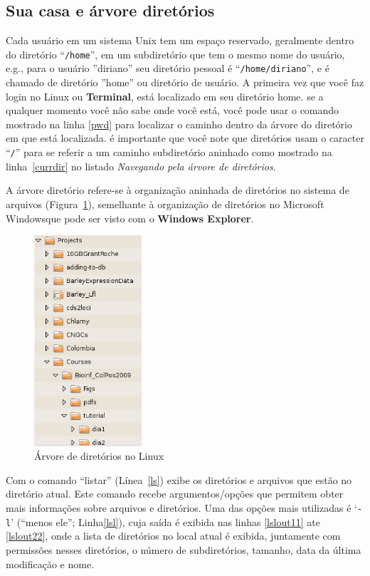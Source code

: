 \documentclass[letter,11pt]{book}
\begin{document}
\subsection{Sua casa e árvore diretórios\label{casadir}}

Cada usuário em um sistema Unix tem um espaço reservado, geralmente dentro do diretório ``\Verb+/home+'', em um subdiretório que tem o mesmo nome do usuário, e.g., para o usuário ''diriano'' seu diretório pessoal é ``\Verb+/home/diriano+'', e é chamado de diretório ''home'' ou diretório de usuário.  A primeira vez que você faz login no Linux ou \textbf{Terminal}, está localizado em seu diretório home. se a qualquer momento você não sabe onde você está, você pode usar o comando mostrado na linha \ref{pwd} para localizar o caminho dentro da árvore do diretório em que está localizada. é importante que você note que diretórios usam o caracter ``\Verb+/+'' para se referir a um caminho subdiretório aninhado como mostrado na linha~\ref{currdir} no listado \textit{Navegando pela árvore de diretórios}.

A árvore diretório refere-se à organização aninhada de diretórios no sistema de arquivos (Figura~\ref{arboldir}), semelhante à organização de diretórios no Microsoft Windows\texttrademark que pode ser visto com o \textbf{Windows Explorer}.

\begin{figure}[ht]
\centering
   \includegraphics[width=4cm]{Figs/arboldir.png}
  \caption{\label{arboldir}Árvore de diretórios no Linux}
\end{figure}

Com o comando ``listar'' (Línea~\ref{ls}) exibe os diretórios e arquivos que estão no diretório atual. Este comando recebe argumentos/opções que permitem obter mais informações sobre arquivos e diretórios. Uma das opções mais utilizadas é `\Verb+-l+' (``menos ele''; Linha\ref{lsl}), cuja saída é exibida nas linhas \ref{lslout11} ate \ref{lslout22}, onde a lista de diretórios no local atual é exibida, juntamente com permissões nesses diretórios, o número de subdiretórios, tamanho, data da última modificação e nome.
\end{document}

